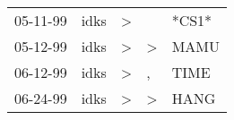 \begin{supertabular}{lllll}
 05-11-99 &  idks &  \textgreater &               &  *CS1* \\
 05-12-99 &  idks &  \textgreater &  \textgreater &   MAMU \\
 06-12-99 &  idks &  \textgreater &             , &   TIME \\
 06-24-99 &  idks &  \textgreater &  \textgreater &   HANG \\
\end{supertabular}
